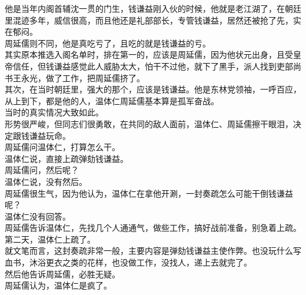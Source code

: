 \begin{multicols}{\theparacolNo}
他是当年内阁首辅沈一贯的门生，钱谦益刚入伙的时候，他就是老江湖了，在朝廷里混迹多年，威信很高，而且他还是礼部部长，专管钱谦益，居然还被抢了先，实在郁闷。\\

周延儒则不同，他是真吃亏了，且吃的就是钱谦益的亏。\\

其实原本推选入阁名单时，排在第一的，应该是周延儒，因为他状元出身，且受皇帝信任，但钱谦益感觉此人威胁太大，怕干不过他，就下了黑手，派人找到吏部尚书王永光，做了工作，把周延儒挤了。\\

其次，在当时朝廷里，强大的那个，应该是钱谦益。他是东林党领袖，一呼百应，从上到下，都是他的人，温体仁周延儒基本算是孤军奋战。\\

当时的真实情况大致如此。\\

形势很严峻，但同志们很勇敢，在共同的敌人面前，温体仁、周延儒擦干眼泪，决定跟钱谦益玩命。\\

周延儒问温体仁，打算怎么干。\\

温体仁说，直接上疏弹劾钱谦益。\\

周延儒问，然后呢？\\

温体仁说，没有然后。\\

周延儒很生气，因为他认为，温体仁在拿他开涮，一封奏疏怎么可能干倒钱谦益呢？\\

温体仁没有回答。\\

周延儒告诉温体仁，先找几个人通通气，做些工作，搞好战前准备，别急着上疏。\\

第二天，温体仁上疏了。\\

就文笔而言，这封奏疏非常一般，主要内容是弹劾钱谦益主使作弊。也没玩什么写血书，沐浴更衣之类的花样，也没做工作，没找人，递上去就完了。\\

然后他告诉周延儒，必胜无疑。\\

周延儒认为，温体仁是疯了。\\
\ifnum{}
	\end{multicols}
\fi
\newpage
